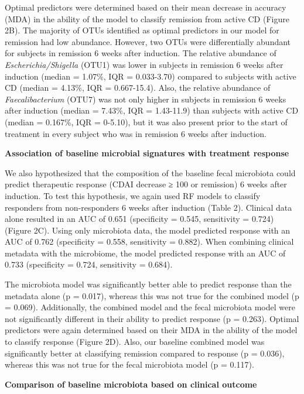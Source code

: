 \documentclass[12pt,]{article}
\begin{document}
Optimal predictors were determined based on their mean decrease in
accuracy (MDA) in the ability of the model to classify remission from
active CD (Figure 2B). The majority of OTUs identified as optimal
predictors in our model for remission had low abundance. However, two
OTUs were differentially abundant for subjects in remission 6 weeks
after induction. The relative abundance of \emph{Escherichia/Shigella}
(OTU1) was lower in subjects in remission 6 weeks after induction
(median = 1.07\%, IQR = 0.033-3.70) compared to subjects with active CD
(median = 4.13\%, IQR = 0.667-15.4). Also, the relative abundance of
\emph{Faecalibacterium} (OTU7) was not only higher in subjects in
remission 6 weeks after induction (median = 7.43\%, IQR = 1.43-11.9)
than subjects with active CD (median = 0.167\%, IQR = 0-5.10), but it
was also present prior to the start of treatment in every subject who
was in remission 6 weeks after induction.

\textbf{Association of baseline microbial signatures with treatment
response}

We also hypothesized that the composition of the baseline fecal
microbiota could predict therapeutic response (CDAI decrease ≥ 100 or
remission) 6 weeks after induction. To test this hypothesis, we again
used RF models to classify responders from non-responders 6 weeks after
induction (Table 2). Clinical data alone resulted in an AUC of 0.651
(specificity = 0.545, sensitivity = 0.724) (Figure 2C). Using only
microbiota data, the model predicted response with an AUC of 0.762
(specificity = 0.558, sensitivity = 0.882). When combining clinical
metadata with the microbiome, the model predicted response with an AUC
of 0.733 (specificity = 0.724, sensitivity = 0.684).

The microbiota model was significantly better able to predict response
than the metadata alone (p = 0.017), whereas this was not true for the
combined model (p = 0.069). Additionally, the combined model and the
fecal microbiota model were not significantly different in their ability
to predict response (p = 0.263). Optimal predictors were again
determined based on their MDA in the ability of the model to classify
response (Figure 2D). Also, our baseline combined model was
significantly better at classifying remission compared to response (p =
0.036), whereas this was not true for the fecal microbiota model (p =
0.117).

\textbf{Comparison of baseline microbiota based on clinical outcome}
\end{document}

